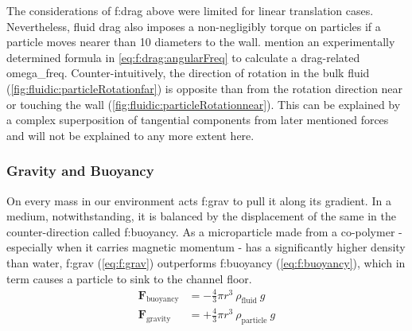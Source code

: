 \begin{figure}[!htb]
	\hfill	
	\addtocounter{subfigure}{-1}
	\label{fig:fluidic:particleRotation}
\end{figure}
The considerations of \acrlong{f:drag} above were limited for linear translation cases. Nevertheless, fluid drag also imposes a non-negligibly torque on particles if a particle moves nearer than 10 diameters to the wall. \citet{lit:fluid:Hydrodynamics} mention an experimentally determined formula in \cref{eq:f:drag:angularFreq} to calculate a drag-related \gls{omega_freq}. Counter-intuitively, the direction of rotation in the bulk fluid (\cref{fig:fluidic:particleRotationfar}) is opposite than from the rotation direction near or touching the wall (\cref{fig:fluidic:particleRotationnear}). This can be explained by a complex superposition of tangential components from later mentioned forces and will not be explained to any more extent here.\cite{lit:fluid:Hydrodynamics,lit:fluid:comparison}

\subsubsection{Gravity and Buoyancy}
On every mass in our environment acts \gls{f:grav} to pull it along its gradient. In a medium, notwithstanding, it is balanced by the displacement of the same in the counter-direction called \gls{f:buoyancy}. As a microparticle made from a co-polymer - especially when it carries magnetic momentum - has a significantly higher density than water, \gls{f:grav} (\cref{eq:f:grav}) outperforms \gls{f:buoyancy} (\cref{eq:f:buoyancy}), which in term causes a particle to sink to the channel floor.
\begin{align}
	\mathbf{F}_\text{buoyancy} &= -\frac{4}{3}\pi r^3 \ \rho_\text{fluid} \ g \label{eq:f:buoyancy}\\
	\mathbf{F}_\text{gravity} &= +\frac{4}{3}\pi r^3 \ \rho_\text{particle} \ g \label{eq:f:grav}
\end{align}


